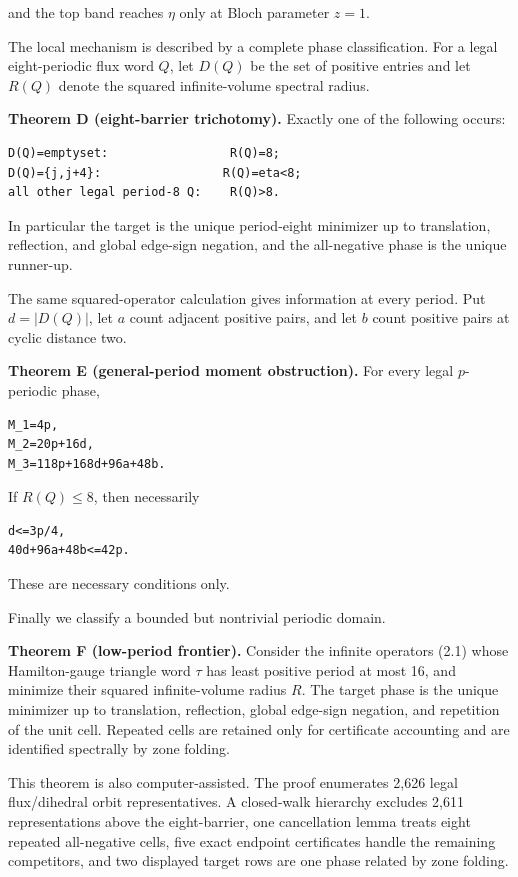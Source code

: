 and the top band reaches \(\eta\) only at Bloch parameter \(z=1\).

The local mechanism is described by a complete phase classification. For a
legal eight-periodic flux word \(Q\), let \(D(Q)\) be the set of positive entries
and let \(R(Q)\) denote the squared infinite-volume spectral radius.

\textbf{Theorem D (eight-barrier trichotomy).}  Exactly one of the following occurs:

\begin{lstlisting}[language={}]
D(Q)=emptyset:                 R(Q)=8;
D(Q)={j,j+4}:                 R(Q)=eta<8;
all other legal period-8 Q:    R(Q)>8.
\end{lstlisting}

In particular the target is the unique period-eight minimizer up to
translation, reflection, and global edge-sign negation, and the all-negative phase
is the unique runner-up.

The same squared-operator calculation gives information at every period. Put
\(d=|D(Q)|\), let \(a\) count adjacent positive pairs, and let \(b\) count positive
pairs at cyclic distance two.

\textbf{Theorem E (general-period moment obstruction).}  For every legal
\(p\)-periodic phase,

\begin{lstlisting}[language={}]
M_1=4p,
M_2=20p+16d,
M_3=118p+168d+96a+48b.
\end{lstlisting}

If \(R(Q)\le 8\), then necessarily

\begin{lstlisting}[language={}]
d<=3p/4,
40d+96a+48b<=42p.
\end{lstlisting}

These are necessary conditions only.

Finally we classify a bounded but nontrivial periodic domain.

\textbf{Theorem F (low-period frontier).} Consider the infinite operators (2.1)
whose Hamilton-gauge triangle word \(\tau\) has least positive period at most 16,
and minimize their squared infinite-volume radius \(R\). The target phase is the
unique minimizer up to translation, reflection, global edge-sign negation, and repetition
of the unit cell. Repeated cells are retained only for certificate accounting
and are identified spectrally by zone folding.

This theorem is also computer-assisted. The proof enumerates 2,626 legal
flux/dihedral orbit representatives. A closed-walk hierarchy excludes 2,611
representations above the eight-barrier, one cancellation lemma treats eight
repeated all-negative cells, five exact endpoint certificates handle the
remaining competitors, and two displayed target rows are one phase related by
zone folding.

